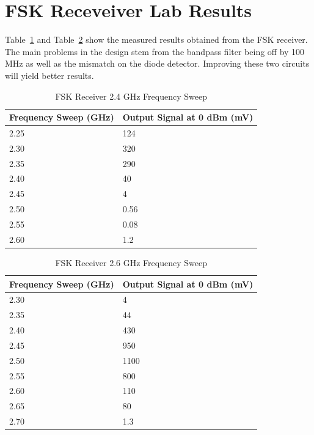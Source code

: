 \documentclass[conference]{IEEEtran}
\begin{document}
\section{FSK Receveiver Lab Results}
Table~\ref{tab:fsk24} and Table~\ref{tab:fsk26} show the measured results obtained from the FSK receiver.  The main problems in the design stem from the bandpass filter being off by 100 MHz as well as the mismatch on the diode detector.  Improving these two circuits will yield better results.

\begin{table}
\caption{FSK Receiver 2.4 GHz Frequency Sweep}
    \begin{tabular}{|l|l|}
    \hline
    Frequency Sweep (GHz) & Output Signal at 0 dBm (mV) \\\hline
    2.25                  & 124                         \\\hline
    2.30                  & 320                         \\\hline
    2.35                  & 290                         \\\hline
    2.40                  & 40                          \\\hline
    2.45                  & 4                           \\\hline
    2.50                  & 0.56                        \\\hline
    2.55                  & 0.08                        \\\hline
    2.60                  & 1.2                         \\\hline
    \end{tabular}
\label{tab:fsk24}
\end{table}

\begin{table}
\caption{FSK Receiver 2.6 GHz Frequency Sweep}
    \begin{tabular}{|l|l|}
    \hline
    Frequency Sweep (GHz) & Output Signal at 0 dBm (mV) \\ \hline
    2.30                  & 4                           \\ \hline
    2.35                  & 44                          \\ \hline
    2.40                  & 430                         \\ \hline
    2.45                  & 950                         \\ \hline
    2.50                  & 1100                        \\ \hline
    2.55                  & 800                         \\\hline
    2.60                  & 110                         \\ \hline
    2.65                  & 80                          \\\hline
    2.70                  & 1.3                         \\\hline
    \end{tabular}
\label{tab:fsk26}
\end{table}
\end{document}

